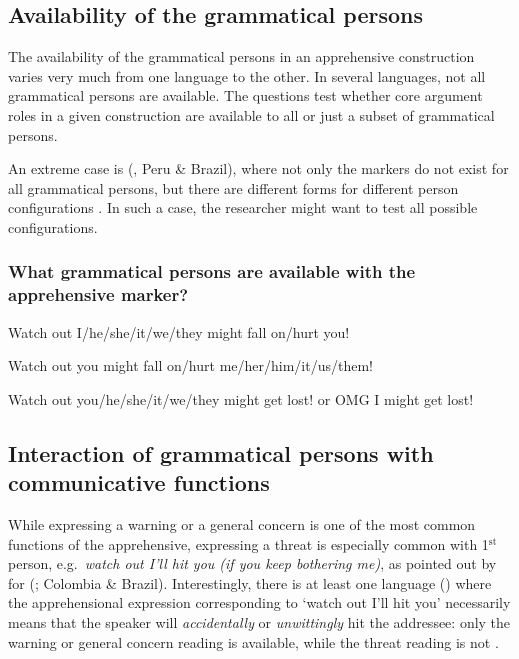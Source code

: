 \documentclass[output=paper,colorlinks,citecolor=brown]{langscibook}
\begin{document}
\subsection{Availability of the grammatical persons}
\label{subsec:apprgrammaticalpersons}

The availability of the grammatical persons in an apprehensive construction varies very much from one language to the other. In several languages, not all grammatical persons are available. The questions test whether core argument roles in a given construction are available to all or just a subset of grammatical persons.

An extreme case is  (, Peru \& Brazil), where not only the markers do not exist for all grammatical persons, but there are different forms for different person configurations \citep[439ff]{fleck2003}. In such a case, the researcher might want to test all possible configurations.

\subsubsection{What grammatical persons are available with the apprehensive marker?}
\label{1.3.1}

\ea \label{p13} {\op}Watch out{\cp} I\textnormal{/}he\textnormal{/}she\textnormal{/}it\textnormal{/}we\textnormal{/}they might fall on\textnormal{/}hurt you!
\z

\ea \label{p14} {\op}Watch out{\cp} you might fall on\textnormal{/}hurt me\textnormal{/}her\textnormal{/}him\textnormal{/}it\textnormal{/}us\textnormal{/}them!
\z

\ea \label{p15} {\op}Watch out{\cp} you\textnormal{/}he\textnormal{/}she\textnormal{/}it\textnormal{/}we\textnormal{/}they might get lost! \textnormal{or} {\op}OMG{\cp} I might get lost!
\z


\subsection{Interaction of grammatical persons with communicative functions}
\label{subsec:apprinteraction}

While expressing a warning or a general concern is one of the most common functions of the apprehensive, expressing a threat is especially common with 1$\mathrm{^{st}}$ person, e.g.\ \textit{watch out I'll hit you (if you keep bothering me)}, as pointed out by \citet[631]{epps2008} for  (; Colombia \& Brazil). Interestingly, there is at least one language () where the apprehensional expression corresponding to `watch out I'll hit you' necessarily means that the speaker will \textit{accidentally} or \textit{unwittingly} hit the addressee: only the warning or general concern reading is available, while the threat reading is not \citep[439; p.c.\ 2014]{fleck2003}.
\end{document}
